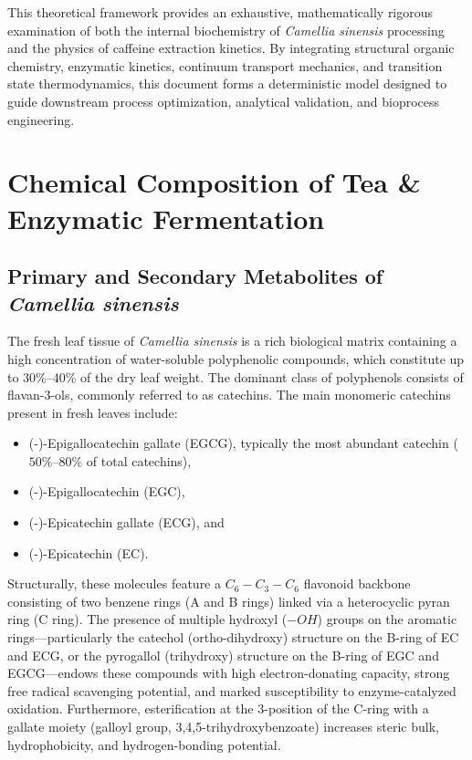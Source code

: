 \documentclass{article}
\begin{document}
This theoretical framework provides an exhaustive, mathematically rigorous examination of both the internal biochemistry of \textit{Camellia sinensis} processing and the physics of caffeine extraction kinetics. By integrating structural organic chemistry, enzymatic kinetics, continuum transport mechanics, and transition state thermodynamics, this document forms a deterministic model designed to guide downstream process optimization, analytical validation, and bioprocess engineering.

\section{Chemical Composition of Tea \& Enzymatic Fermentation}

\subsection{Primary and Secondary Metabolites of \textit{Camellia sinensis}}

The fresh leaf tissue of \textit{Camellia sinensis} is a rich biological matrix containing a high concentration of water-soluble polyphenolic compounds, which constitute up to 30\%–40\% of the dry leaf weight. The dominant class of polyphenols consists of flavan-3-ols, commonly referred to as catechins. The main monomeric catechins present in fresh leaves include:
\begin{itemize}
    \item (-)-Epigallocatechin gallate (EGCG), typically the most abundant catechin ($50\%\text{--}80\%$ of total catechins),
    \item (-)-Epigallocatechin (EGC),
    \item (-)-Epicatechin gallate (ECG), and
    \item (-)-Epicatechin (EC).
\end{itemize}

Structurally, these molecules feature a $C_6-C_3-C_6$ flavonoid backbone consisting of two benzene rings (A and B rings) linked via a heterocyclic pyran ring (C ring). The presence of multiple hydroxyl ($-OH$) groups on the aromatic rings—particularly the catechol (ortho-dihydroxy) structure on the B-ring of EC and ECG, or the pyrogallol (trihydroxy) structure on the B-ring of EGC and EGCG—endows these compounds with high electron-donating capacity, strong free radical scavenging potential, and marked susceptibility to enzyme-catalyzed oxidation. Furthermore, esterification at the 3-position of the C-ring with a gallate moiety (galloyl group, 3,4,5-trihydroxybenzoate) increases steric bulk, hydrophobicity, and hydrogen-bonding potential.
\end{document}
